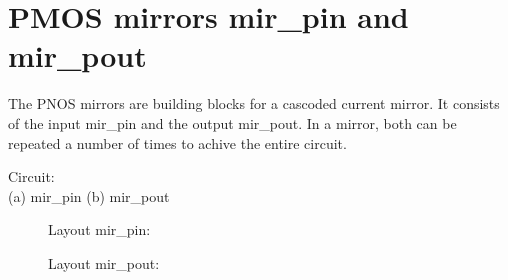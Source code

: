\section {PMOS mirrors mir\_pin and mir\_pout}
The PNOS mirrors are building blocks for a cascoded current mirror.
It consists of the input mir\_pin and the output mir\_pout.
In a mirror, both can be repeated a number of times to achive the
entire circuit.

Circuit:\\
(a) mir\_pin (b) mir\_pout
\vspace{1cm}
\begin{figure}[h]
\centerline{}
\end{figure}
\newpage
\begin{figure}[h]
Layout mir\_pin:\\

\centerline{}
\vspace{1cm}
Layout mir\_pout:\\

\centerline{}
\end{figure}
\clearpage
